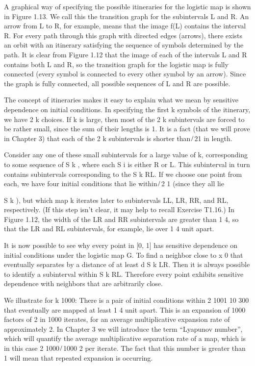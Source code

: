 \documentclass[12pt]{article}
\begin{document}
A graphical way of specifying the possible itineraries for the logistic map is shown in Figure 1.13. We 
call this the transition graph for the subintervals L and R. An arrow from L to R, for example, means that 
the image f(L) contains the interval R. For every path through this graph with directed edges (arrows), 
there exists an orbit with an itinerary satisfying the sequence of symbols determined by the path. It is 
clear from Figure 1.12 that the image of each of the intervals L and R contains both L and R, so the 
transition graph for the logistic map is fully connected (every symbol is connected to every other symbol 
by an arrow). Since the graph is fully connected, all possible sequences of L and R are possible.

The concept of itineraries makes it easy to explain what we mean by sensitive dependence on initial 
conditions. In specifying the ﬁrst k symbols of the itinerary, we have 2 k choices. If k is large, then 
most of the 2 k subintervals are forced to be rather small, since the sum of their lengths is 1. It is a 
fact (that we will prove in Chapter 3) that each of the 2 k subintervals is shorter than   ̸ 21  in length.

Consider any one of these small subintervals for a large value of k, corresponding to some sequence of 
 S k , where each S i is either R or L. This subinterval in turn contains subintervals corresponding to the 
 S k RL. If we choose one point from each, we have four initial conditions that lie within 
 ̸ 2 1 (since they all lie

 S k ), but which map k iterates later to subintervals LL, LR, RR, and RL, respectively. (If this step 
isn’t clear, it may help to recall Exercise T1.16.) In Figure 1.12, the width of the LR and RR subintervals 
are greater than 1  4, so that the LR and RL subintervals, for example, lie over 1  4 unit apart.

It is now possible to see why every point in [0, 1] has sensitive dependence on initial conditions under 
the logistic map G. To ﬁnd a neighbor close to x 0 that eventually separates by a distance of at least d  
 S k LR. Then it is always possible to identify a subinterval within 
 S k RL. Therefore every point exhibits sensitive dependence with neighbors that are arbitrarily close.

We illustrate for k  1000: There is a pair of initial conditions within 2 1001  10 300 that eventually are 
mapped at least 1  4 unit apart. This is an expansion of 1000 factors of 2 in 1000 iterates, for an average 
multiplicative expansion rate of approximately 2. In Chapter 3 we will introduce the term “Lyapunov 
number”, which will quantify the average multiplicative separation rate of a map, which is in this case 2 
1000 ̸ 1000  2 per iterate. The fact that this number is greater than 1 will mean that repeated expansion is 
occurring.
\end{document}
